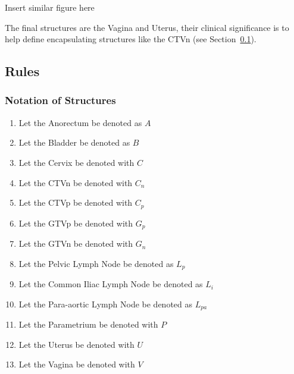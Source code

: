 \documentclass[12pt,twoside]{report}
\begin{document}
\begin{warning}
  Insert similar figure here
\end{warning}

The final structures are the Vagina and Uterus, their clinical significance is to help define encapsulating structures like the CTVn (see Section~\ref{sec:data-delineation-rules}).

\subsection{Rules}\label{sec:data-delineation-rules}

\begin{minipage}{0.5\textwidth}
  \subsubsection{Notation of Structures}
  \begin{enumerate}
    \item Let the Anorectum be denoted as $A$
    \item Let the Bladder be denoted as $B$
    \item Let the Cervix be denoted with $C$
    \item Let the CTVn be denoted with $C_n$
    \item Let the CTVp be denoted with $C_p$
    \item Let the GTVp be denoted with $G_p$
    \item Let the GTVn be denoted with $G_n$
  \end{enumerate}
\end{minipage}%
\begin{minipage}{0.5\textwidth}

  \begin{enumerate}
    \setcounter{enumi}{7}
    \item Let the Pelvic Lymph Node be denoted as $L_p$
    \item Let the Common Iliac Lymph Node be denoted as $L_i$
    \item Let the Para-aortic Lymph Node be denoted as $L_{pa}$
    \item Let the Parametrium be denoted with $P$
    \item Let the Uterus be denoted with $U$
    \item Let the Vagina be denoted with $V$
  \end{enumerate}

\end{minipage}
\end{document}
